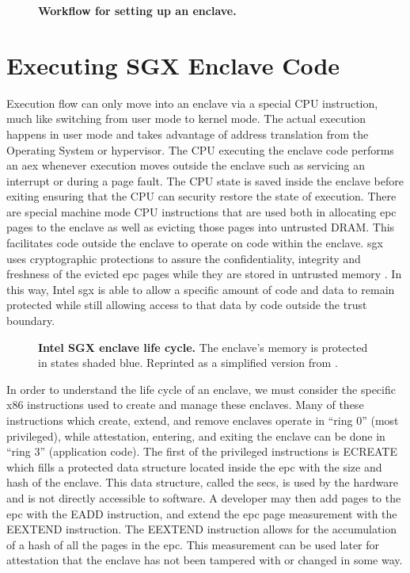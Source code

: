 \begin{figure}[htbp]
\centering

\caption[Setting Up Intel SGX]{\textbf{Workflow for setting up an enclave.}}
\label{fig:sgx-setup}
\end{figure}

\section{Executing SGX Enclave Code}
Execution flow can only move into an enclave via a special CPU instruction, much like switching from user mode to kernel mode. The actual execution happens in user mode and takes advantage of address translation from the Operating System or hypervisor. The CPU executing the enclave code performs an \gls{aex} whenever execution moves outside the enclave such as servicing an interrupt or during a page fault. The CPU state is saved inside the enclave before exiting ensuring that the CPU can security restore the state of execution. There are special machine mode CPU instructions that are used both in allocating \gls{epc} pages to the enclave as well as evicting those pages into untrusted DRAM. This facilitates code outside the enclave to operate on code within the enclave. \gls{sgx} uses cryptographic protections to assure the confidentiality, integrity and freshness of the evicted \gls{epc} pages while they are stored in untrusted memory \cite{Costan2016}. In this way, Intel \gls{sgx} is able to allow a specific amount of code and data to remain protected while still allowing access to that data by code outside the trust boundary.

\begin{figure}[ht]
\makebox[\textwidth][c]{
}\caption[Intel SGX Enclave Lifecycle]{\textbf{Intel SGX enclave life cycle.} The enclave's memory is protected in states shaded blue. Reprinted as a simplified version from \cite{Costan2016}.\label{figure:sgx-enclave-life-cycle}}
\end{figure}

In order to understand the life cycle of an enclave, we must consider the specific x86 instructions used to create and manage these enclaves. Many of these instructions which create, extend, and remove enclaves operate in ``ring 0'' (most privileged), while attestation, entering, and exiting the enclave can be done in ``ring 3'' (application code). The first of the privileged instructions is ECREATE which fills a protected data structure located inside the \gls{epc} with the size and hash of the enclave. This data structure, called the \gls{secs}, is used by the hardware and is not directly accessible to software. A developer may then add pages to the \gls{epc} with the EADD instruction, and extend the \gls{epc} page measurement with the EEXTEND instruction. The EEXTEND instruction allows for the accumulation of a hash of all the pages in the \gls{epc}. This measurement can be used later for attestation that the enclave has not been tampered with or changed in some way.

